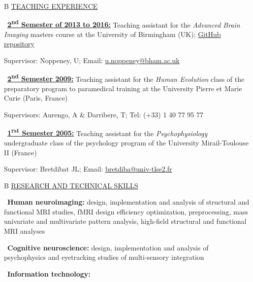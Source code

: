 \documentclass[a4paper,12pt,oneside]{letter}
\begin{document}
{\medskip 

\begin{tabular}{B}
 \underline{TEACHING EXPERIENCE}
\end{tabular}

\textbullet~\underline{\textbf{2\textsuperscript{nd} Semester of 2013 to 2016:}} 	Teaching assistant for the \textit{Advanced Brain Imaging} masters course at the University of Birmingham (UK); \href{https://github.com/Remi-Gau/advanced_fMRI_course}{GitHub repository}

Supervisor: Noppeney, U; Email: \href{mailto:u.noppeney@bham.ac.uk}{u.noppeney@bham.ac.uk}

\textbullet~\underline{\textbf{2\textsuperscript{nd} Semester 2009:}} 	Teaching assistant for the \textit{Human Evolution} class of the preparatory program to paramedical training at the University Pierre et Marie Curie (Paris, France)

Supervisors: Aurengo, A \& Darribere, T; Tel: (+33) 1 40 77 95 77

\textbullet~\underline{\textbf{1\textsuperscript{rst} Semester 2005:}} 	Teaching assistant for the \textit{Psychophysiology} undergraduate class of the psychology program of the University Mirail-Toulouse II (France)

Supervisor: Bretdibat JL; Email: \href{mailto:bretdiba@univ-tlse2.fr}{bretdiba@univ-tlse2.fr}


\medskip 

\begin{tabular}{B}
 \underline{RESEARCH AND TECHNICAL SKILLS}
\end{tabular}


\textbullet~\textbf{Human neuroimaging:} design, implementation and analysis of structural and functional MRI studies, fMRI design efficiency optimization, preprocessing, mass univariate and multivariate pattern analysis, high-field structural and functional MRI analyses

\textbullet~\textbf{Cognitive neuroscience:} design, implementation and analysis of psychophysics and eyetracking studies of multi-sensory integration 


\pagebreak

\textbullet~\textbf{Information technology:}

}
\end{document}
